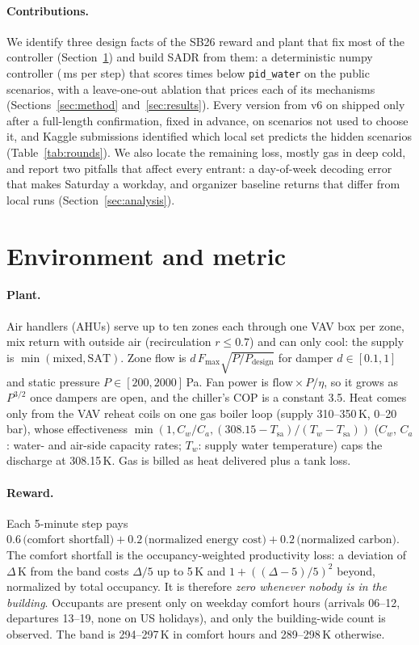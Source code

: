 \documentclass{article}
\begin{document}
\paragraph{Contributions.} We identify three design facts of the SB26 reward and plant that fix most of the controller (Section~\ref{sec:env}) and build SADR from them: a deterministic numpy controller (\PolicyMsOurs{}\,ms per step) that scores \RElvPwTimes{} times below \texttt{pid\_water} on the public scenarios, with a leave-one-out ablation that prices each of its mechanisms (Sections~\ref{sec:method} and~\ref{sec:results}). Every version from v6 on shipped only after a full-length confirmation, fixed in advance, on scenarios not used to choose it, and Kaggle submissions identified which local set predicts the hidden scenarios (Table~\ref{tab:rounds}). We also locate the remaining loss, mostly gas in deep cold, and report two pitfalls that affect every entrant: a day-of-week decoding error that makes Saturday a workday, and organizer baseline returns that differ from local runs (Section~\ref{sec:analysis}).

\section{Environment and metric}
\label{sec:env}

\paragraph{Plant.} Air handlers (AHUs) serve up to ten zones each through one VAV box per zone, mix return with outside air (recirculation $r\le 0.7$) and can only cool: the supply is $\min(\text{mixed}, \text{SAT})$. Zone flow is $d\,F_{\max}\sqrt{P/P_{\text{design}}}$ for damper $d\in[0.1,1]$ and static pressure $P\in[200,2000]$\,Pa. Fan power is $\text{flow}\times P/\eta$, so it grows as $P^{3/2}$ once dampers are open, and the chiller's COP is a constant 3.5. Heat comes only from the VAV reheat coils on one gas boiler loop (supply 310--350\,K, 0--20\,bar), whose effectiveness $\min(1, C_w/C_a, (308.15-T_{\text{sa}})/(T_w - T_{\text{sa}}))$ ($C_w$, $C_a$: water- and air-side capacity rates; $T_w$: supply water temperature) caps the discharge at 308.15\,K. Gas is billed as heat delivered plus a tank loss.

\paragraph{Reward.} Each 5-minute step pays $0.6\,\text{(comfort shortfall)} + 0.2\,\text{(normalized energy cost)} + 0.2\,\text{(normalized carbon)}$. The comfort shortfall is the occupancy-weighted productivity loss: a deviation of $\Delta$\,K from the band costs $\Delta/5$ up to 5\,K and $1+((\Delta-5)/5)^2$ beyond, normalized by total occupancy. It is therefore \emph{zero whenever nobody is in the building}. Occupants are present only on weekday comfort hours (arrivals 06--12, departures 13--19, none on US holidays), and only the building-wide count is observed. The band is 294--297\,K in comfort hours and 289--298\,K otherwise.
\end{document}
